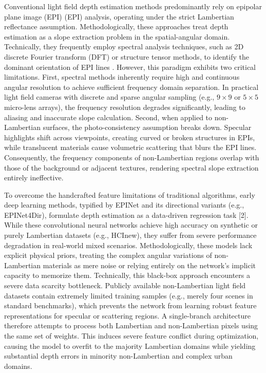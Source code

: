 Conventional light field depth estimation methods predominantly rely on epipolar plane image (EPI) (EPI) analysis, operating under the strict Lambertian reflectance assumption. Methodologically, these approaches treat depth estimation as a slope extraction problem in the spatial-angular domain. Technically, they frequently employ spectral analysis techniques, such as 2D discrete Fourier transform (DFT) or structure tensor methods, to identify the dominant orientation of EPI lines . However, this paradigm exhibits two critical limitations. First, spectral methods inherently require high and continuous angular resolution to achieve sufficient frequency domain separation. In practical light field cameras with discrete and sparse angular sampling (e.g., $9 \times 9$ or $5 \times 5$ micro-lens arrays), the frequency resolution degrades significantly, leading to aliasing and inaccurate slope calculation. Second, when applied to non-Lambertian surfaces, the photo-consistency assumption breaks down. Specular highlights shift across viewpoints, creating curved or broken structures in EPIs, while translucent materials cause volumetric scattering that blurs the EPI lines. Consequently, the frequency components of non-Lambertian regions overlap with those of the background or adjacent textures, rendering spectral slope extraction entirely ineffective.

To overcome the handcrafted feature limitations of traditional algorithms, early deep learning methods, typified by EPINet and its directional variants (e.g., EPINet4Dir), formulate depth estimation as a data-driven regression task [2]. While these convolutional neural networks achieve high accuracy on synthetic or purely Lambertian datasets (e.g., HCInew), they suffer from severe performance degradation in real-world mixed scenarios. Methodologically, these models lack explicit physical priors, treating the complex angular variations of non-Lambertian materials as mere noise or relying entirely on the network's implicit capacity to memorize them. Technically, this black-box approach encounters a severe data scarcity bottleneck. Publicly available non-Lambertian light field datasets contain extremely limited training samples (e.g., merely four scenes in standard benchmarks), which prevents the network from learning robust feature representations for specular or scattering regions. A single-branch architecture therefore attempts to process both Lambertian and non-Lambertian pixels using the same set of weights. This induces severe feature conflict during optimization, causing the model to overfit to the majority Lambertian domains while yielding substantial depth errors in minority non-Lambertian and complex urban domains.

